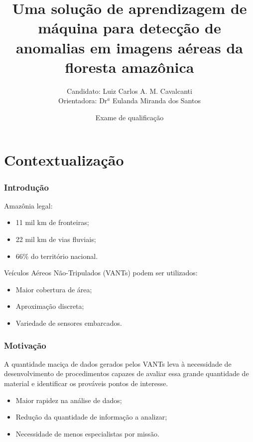 \documentclass[t]{beamer}
\title %
{Uma solução de aprendizagem de máquina para detecção de anomalias em imagens aéreas da floresta amazônica}
\author %
{Candidato: Luiz Carlos A. M. Cavalcanti
\\Orientadora: Dr$^a$ Eulanda Miranda dos Santos} %
\date[] %
{Exame de qualificação}
\begin{document}
  \begin{frame}\titlepage\end{frame}


\section{Contextualização}

\begin{frame}
\frametitle{Introdução}

	Amazônia legal:
	\begin{itemize}
		\item 11 mil km de fronteiras;
		\item 22 mil km de vias fluviais;
		\item 66\% do território nacional.
	\end{itemize}

	\vspace{0.5cm}

	Veículos Aéreos Não-Tripulados (VANTs) podem ser utilizados:
	\begin{itemize}
		\item Maior cobertura de área;
		\item Aproximação discreta;
		\item Variedade de sensores embarcados.
	\end{itemize}

\end{frame}

\begin{frame}
\frametitle{Motivação}

A quantidade maciça de dados gerados pelos VANTs leva à necessidade de desenvolvimento de procedimentos capazes de avaliar essa grande quantidade de material e identificar os prováveis pontos de interesse. 

\vspace{0.5cm}

\begin{itemize}
	\item Maior rapidez na análise de dados;
	\item Redução da quantidade de informação a analizar;
	\item Necessidade de menos especialistas por missão.
\end{itemize}


\end{frame}
\end{document}
